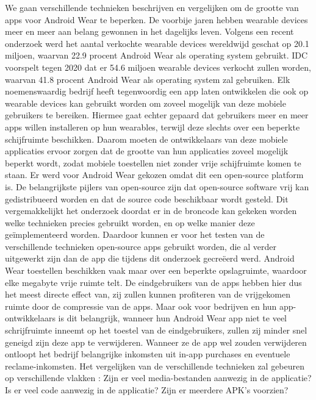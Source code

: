 We gaan verschillende technieken beschrijven en vergelijken om de grootte van apps voor Android Wear te beperken. De voorbije jaren hebben wearable devices meer en meer aan belang gewonnen in het dagelijks leven. Volgens een recent onderzoek werd het aantal verkochte wearable devices wereldwijd geschat op 20.1 miljoen, waarvan 22.9 procent Android Wear als operating system gebruikt. IDC voorspelt tegen 2020 dat er 54.6 miljoen wearable devices verkocht zullen worden, waarvan 41.8 procent Android Wear als operating system zal gebruiken. \autocite{IDC} Elk noemenswaardig bedrijf heeft tegenwoordig een app laten ontwikkelen die ook op wearable devices kan gebruikt worden om zoveel mogelijk van deze mobiele gebruikers te bereiken. Hiermee gaat echter gepaard dat gebruikers meer en meer apps willen installeren op hun wearables, terwijl deze slechts over een beperkte schijfruimte beschikken. Daarom moeten de ontwikkelaars van deze mobiele applicaties ervoor zorgen dat de grootte van hun applicaties zoveel mogelijk beperkt wordt, zodat mobiele toestellen niet zonder vrije schijfruimte komen te staan. Er werd voor Android Wear gekozen omdat dit een open-source platform is. De belangrijkste pijlers van open-source zijn dat open-source software vrij kan gedistribueerd worden en dat de source code beschikbaar wordt gesteld. \autocite{OpenSourceInitiative} Dit vergemakkelijkt het onderzoek doordat er in de broncode kan gekeken worden welke technieken precies gebruikt worden, en op welke manier deze geïmplementeerd worden. Daardoor kunnen er voor het testen van de verschillende technieken open-source apps gebruikt worden, die al verder uitgewerkt zijn dan de app die tijdens dit onderzoek gecreëerd werd. Android Wear toestellen beschikken vaak maar over een beperkte opslagruimte, waardoor elke megabyte vrije ruimte telt. De eindgebruikers van de apps hebben hier dus het meest directe effect van, zij zullen kunnen profiteren van de vrijgekomen ruimte door de compressie van de apps. Maar ook voor bedrijven en hun app-ontwikkelaars is dit belangrijk, wanneer hun Android Wear app niet te veel schrijfruimte inneemt op het toestel van de eindgebruikers, zullen zij minder snel geneigd zijn deze app te verwijderen. Wanneer ze de app wel zouden verwijderen ontloopt het bedrijf belangrijke inkomsten uit in-app purchases en eventuele reclame-inkomsten. Het vergelijken van de verschillende technieken zal gebeuren op verschillende vlakken : Zijn er veel media-bestanden aanwezig in de applicatie? Is er veel code aanwezig in de applicatie? Zijn er meerdere APK's voorzien?

